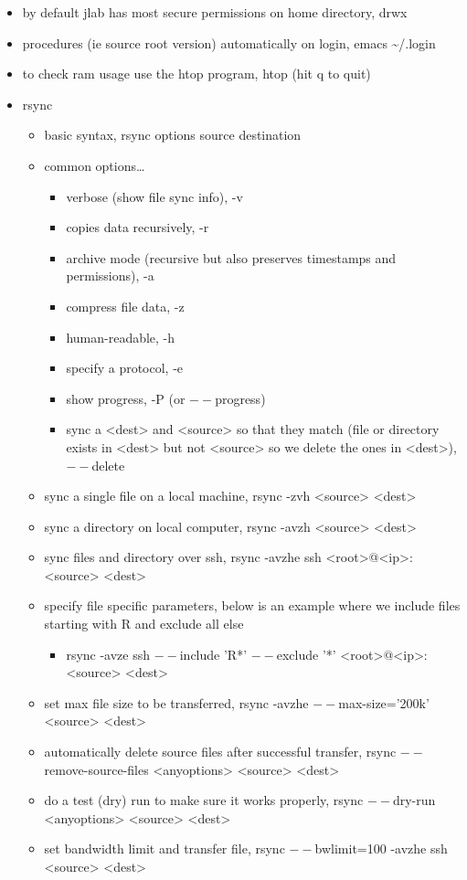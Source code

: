 \documentclass[11pt]{article}
\begin{document}
\begin{itemize}
\item by default jlab has most secure permissions on home directory, drwx
\item procedures (ie source root version) automatically on login, emacs \textasciitilde{}/.login
\item to check ram usage use the htop program, htop (hit q to quit)
\item rsync
\begin{itemize}
\item basic syntax, rsync options source destination
\item common options\ldots{}
\begin{itemize}
\item verbose (show file sync info), -v
\item copies data recursively, -r
\item archive mode (recursive but also preserves timestamps and permissions), -a
\item compress file data, -z
\item human-readable, -h
\item specify a protocol, -e
\item show progress, -P (or \(--\)progress)
\item sync a <dest> and <source> so that they match (file or directory exists in <dest> but not <source> so we delete the ones in <dest>), \(--\)delete
\end{itemize}
\item sync a single file on a local machine, rsync -zvh <source> <dest>
\item sync a directory on local computer, rsync -avzh <source> <dest>
\item sync files and directory over ssh, rsync -avzhe ssh <root>@<ip>:<source> <dest>
\item specify file specific parameters, below is an example where we include files starting with R and exclude all else
\begin{itemize}
\item rsync -avze ssh \(--\)include 'R*' \(--\)exclude '*' <root>@<ip>:<source> <dest>
\end{itemize}
\item set max file size to be transferred, rsync -avzhe \(--\)max-size='200k' <source> <dest>
\item automatically delete source files after successful transfer, rsync \(--\)remove-source-files <anyoptions> <source> <dest>
\item do a test (dry) run to make sure it works properly, rsync \(--\)dry-run <anyoptions> <source> <dest>
\item set bandwidth limit and transfer file, rsync \(--\)bwlimit=100 -avzhe ssh <source> <dest>
\end{itemize}
\end{itemize}
\end{document}
